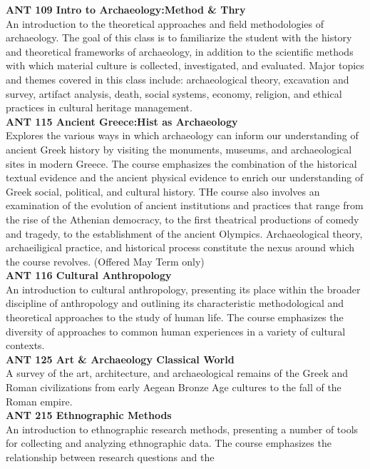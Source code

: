 \documentclass[
  letterpaper,
]{scrbook}
\begin{document}
\textbf{ANT 109 Intro to Archaeology:Method \& Thry}\\
An introduction to the theoretical approaches and field methodologies of
archaeology. The goal of this class is to familiarize the student with
the history and theoretical frameworks of archaeology, in addition to
the scientific methods with which material culture is collected,
investigated, and evaluated. Major topics and themes covered in this
class include: archaeological theory, excavation and survey, artifact
analysis, death, social systems, economy, religion, and ethical
practices in cultural heritage management.\\
\textbf{ANT 115 Ancient Greece:Hist as Archaeology}\\
Explores the various ways in which archaeology can inform our
understanding of ancient Greek history by visiting the monuments,
museums, and archaeological sites in modern Greece. The course
emphasizes the combination of the historical textual evidence and the
ancient physical evidence to enrich our understanding of Greek social,
political, and cultural history. THe course also involves an examination
of the evolution of ancient institutions and practices that range from
the rise of the Athenian democracy, to the first theatrical productions
of comedy and tragedy, to the establishment of the ancient Olympics.
Archaeological theory, archaeiligical practice, and historical process
constitute the nexus around which the course revolves. (Offered May Term
only)\\
\textbf{ANT 116 Cultural Anthropology}\\
An introduction to cultural anthropology, presenting its place within
the broader discipline of anthropology and outlining its characteristic
methodological and theoretical approaches to the study of human life.
The course emphasizes the diversity of approaches to common human
experiences in a variety of cultural contexts.\\
\textbf{ANT 125 Art \& Archaeology Classical World}\\
A survey of the art, architecture, and archaeological remains of the
Greek and Roman civilizations from early Aegean Bronze Age cultures to
the fall of the Roman empire.\\
\textbf{ANT 215 Ethnographic Methods}\\
An introduction to ethnographic research methods, presenting a number of
tools for collecting and analyzing ethnographic data. The course
emphasizes the relationship between research questions and the
\end{document}
